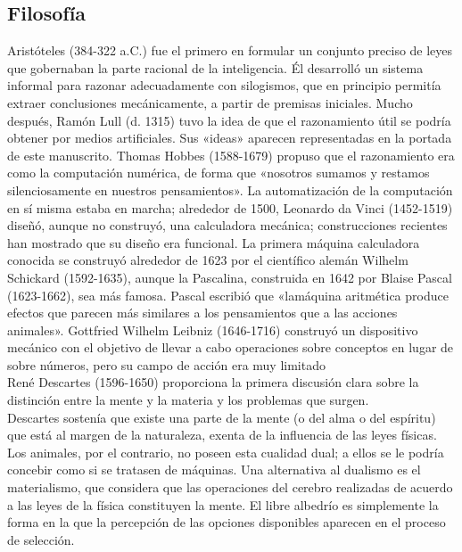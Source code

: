 \documentclass[12pt,a4paper]{report}
\begin{document}
\subsection*{Filosofía}
Aristóteles (384-322 a.C.) fue el primero en formular un conjunto preciso de leyes que gobernaban la parte racional de la inteligencia. Él desarrolló un sistema informal para razonar adecuadamente con silogismos, que en principio permitía extraer conclusiones mecánicamente, a partir de premisas iniciales. Mucho después, Ramón Lull (d. 1315) tuvo la idea de que el razonamiento útil se podría obtener por medios artificiales. Sus «ideas» aparecen representadas en la portada de este manuscrito. Thomas Hobbes (1588-1679) propuso que el razonamiento era como la computación numérica, de forma que «nosotros sumamos y restamos silenciosamente en nuestros pensamientos». La automatización de la computación en sí misma estaba en marcha; alrededor de 1500, Leonardo da Vinci (1452-1519) diseñó, aunque no construyó, una calculadora mecánica; construcciones recientes han mostrado que su diseño era funcional. La primera máquina calculadora conocida se construyó alrededor de 1623 por el científico alemán Wilhelm Schickard (1592-1635), aunque la Pascalina, construida en 1642 por Blaise Pascal (1623-1662), sea más famosa. Pascal escribió que «lamáquina aritmética produce efectos que parecen más similares a los pensamientos que a las acciones animales». Gottfried Wilhelm Leibniz (1646-1716) construyó un dispositivo mecánico con el objetivo de llevar a cabo operaciones sobre conceptos en lugar de sobre números, pero su campo de acción era muy limitado\\René Descartes (1596-1650) proporciona la primera discusión clara sobre la distinción entre la mente y la materia y los problemas que surgen.\\Descartes sostenía que existe una parte de la mente (o del alma o del espíritu) que está al margen de la naturaleza, exenta de la influencia de las leyes físicas. Los animales, por el contrario, no poseen esta cualidad dual; a ellos se le podría concebir como si se tratasen de máquinas. Una alternativa al dualismo es el materialismo, que considera que las operaciones del cerebro realizadas de acuerdo a las leyes de la física constituyen la mente. El libre albedrío es simplemente la forma en la que la percepción de las opciones disponibles aparecen en el proceso de selección.
\end{document}
